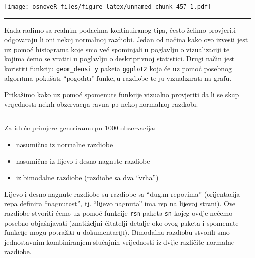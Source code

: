 \documentclass[]{book}
\providecommand{\tightlist}{%
  \setlength{\itemsep}{0pt}\setlength{\parskip}{0pt}}
\theoremstyle{definition}
\theoremstyle{definition}
\theoremstyle{definition}
\theoremstyle{remark}
\begin{document}
\texttt{[image: osnoveR\_files/figure-latex/unnamed-chunk-457-1.pdf]}

\begin{center}\rule{0.5\linewidth}{\linethickness}\end{center}

Kada radimo sa realnim podacima kontinuiranog tipa, često želimo
provjeriti odgovaraju li oni nekoj normalnoj razdiobi. Jedan od načina
kako ovo izvesti jest uz pomoć histograma koje smo već spominjali u
poglavlju o vizualizaciji te kojima ćemo se vratiti u poglavlju o
deskriptivnoj statistici. Drugi način jest koristiti funkciju
\texttt{geom\_density} paketa \texttt{ggplot2} koja će uz pomoć posebnog
algoritma pokušati ``pogoditi'' funkciju razdiobe te ju vizualizirati na
grafu.

Prikažimo kako uz pomoć spomenute funkcije vizualno provjeriti da li se
skup vrijednosti nekih obzervacija ravna po nekoj normalnoj razdiobi.

\begin{center}\rule{0.5\linewidth}{\linethickness}\end{center}

Za iduće primjere generiramo po 1000 obzervacija:

\begin{itemize}
\tightlist
\item
  nasumično iz normalne razdiobe
\item
  nasumično iz lijevo i desno nagnute razdiobe
\item
  iz bimodalne razdiobe (razdiobe sa dva ``vrha'')
\end{itemize}

Lijevo i desno nagnute razdiobe su razdiobe sa ``dugim repovima''
(orijentacija repa definira ``nagnutost'', tj. ``lijevo nagnuta'' ima
rep na lijevoj strani). Ove razdiobe stvoriti ćemo uz pomoć funkcije
\texttt{rsn} paketa \texttt{sn} kojeg ovdje nećemo posebno objašnjavati
(znatiželjni čitatelji detalje oko ovog paketa i spomenute funkcije mogu
potražiti u dokumentaciji). Bimodalnu razdiobu stvorili smo jednostavnim
kombiniranjem slučajnih vrijednosti iz dvije različite normalne
razdiobe.
\end{document}
